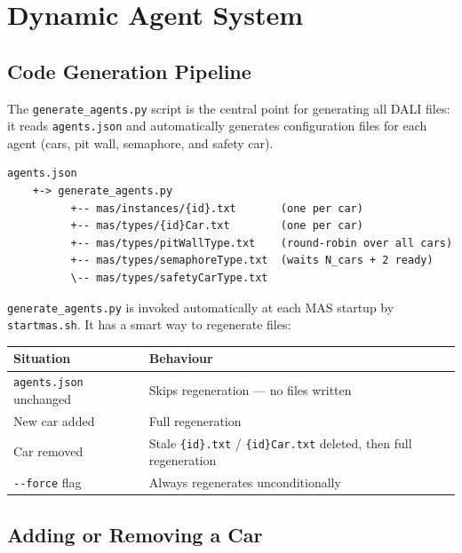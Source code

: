 \section{Dynamic Agent System}

\subsection{Code Generation Pipeline}

The \texttt{generate\_agents.py} script is the central point for generating all
DALI files: it reads \texttt{agents.json} and automatically generates configuration
files for each agent (cars, pit wall, semaphore, and safety car).

\begin{minipage}{\linewidth}
\begin{lstlisting}[language={}, numbers=none, frame=none, backgroundcolor=\color{white}, basicstyle=\ttfamily]
agents.json
    +-> generate_agents.py
          +-- mas/instances/{id}.txt       (one per car)
          +-- mas/types/{id}Car.txt        (one per car)
          +-- mas/types/pitWallType.txt    (round-robin over all cars)
          +-- mas/types/semaphoreType.txt  (waits N_cars + 2 ready)
          \-- mas/types/safetyCarType.txt
\end{lstlisting}
\end{minipage}

\noindent
\texttt{generate\_agents.py} is invoked automatically at each MAS startup by
\texttt{startmas.sh}. It has a smart way to regenerate files:

\begin{longtable}{@{} l p{9cm} @{}}
\toprule
\textbf{Situation} & \textbf{Behaviour} \\
\midrule
\endhead
\texttt{agents.json} unchanged & Skips regeneration --- no files written \\
New car added                  & Full regeneration \\
Car removed                    & Stale \texttt{\{id\}.txt} / \texttt{\{id\}Car.txt} deleted, then full regeneration \\
\texttt{-{}-force} flag        & Always regenerates unconditionally \\
\bottomrule
\end{longtable}

\subsection{Adding or Removing a Car}

